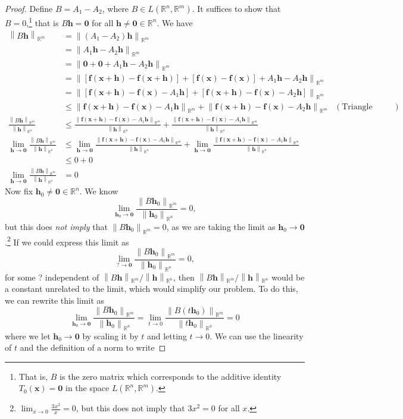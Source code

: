 \documentclass{article}
\newcommand{\R}{\mathbb{R}}
\newcommand{\x}{\mathbf{x}}
\newcommand{\f}{\mathbf{f}}
\newcommand{\h}{\mathbf{h}}
\newcommand{\ze}{\mathbf{0}}
\newcommand{\norm}[1]{\left\lVert#1\right\rVert}
\theoremstyle{definition}
\begin{document}
	\begin{proof}
		Define $ B = A_1 - A_2 $, where $ B\in L(\R^n,\R^m) $. It suffices to show that $ B = 0 $,\footnote{That is, $ B $ is the zero matrix which corresponds to the additive identity $ T_0(\x)=\ze $ in the space $ L(\R^n,\R^m) $. } that is $ B\h = \ze $ for all $ \h\neq\ze\in \R^n $. We have 
		\begin{align*}
			\norm{B\h}_{\R^m} &= \norm{(A_1 - A_2)\h}_{\R^m}\\
			& = \norm{ A_1\h -  A_2\h}_{\R^m}\\ 
			& = \norm{ \ze + \ze + A_1\h -  A_2\h}_{\R^m} \\
			& = \norm{ \left[\f(\x+\h) - \f(\x+\h)\right] +\left[\f(\x) - \f(\x)\right] + A_1\h -  A_2\h}_{\R^m} \\
			& = \norm{ \left[\f(\x+\h) - \f(\x) - A_1\h \right] +\left[\f(\x+\h) - \f(\x) - A_2\h \right]}_{\R^m}\\
			& \le \norm{\f(\x+\h) - \f(\x) - A_1\h}_{\R^m} +  \norm{\f(\x+\h) - \f(\x) - A_2\h}_{\R^m} & (\text{Triangle Inequality})
			\\\frac{\norm{B\h}_{\R^m}}{\norm{\h}_{\R^n}} & \le \frac{\norm{\f(\x+\h) - \f(\x) - A_1\h}_{\R^m} }{\norm{\h}_{\R^n}} + \frac{\norm{\f(\x+\h) - \f(\x) - A_1\h}_{\R^m} }{\norm{\h}_{\R^n}}	\\ 	\lim\limits_{\mathbf h\to \ze}\frac{\norm{B\h}_{\R^m}}{\norm{\h}_{\R^n}} & \le 	\lim\limits_{\mathbf h\to \ze}\frac{\norm{\f(\x+\h) - \f(\x) - A_1\h}_{\R^m} }{\norm{\h}_{\R^n}} + 	\lim\limits_{\mathbf h\to \ze}\frac{\norm{\f(\x+\h) - \f(\x) - A_1\h}_{\R^m} }{\norm{\h}_{\R^n}}\\ & \le 0 + 0 \\\lim\limits_{\mathbf h\to \ze}\frac{\norm{B\h}_{\R^m}}{\norm{\h}_{\R^n}}& = 0
		\end{align*}
		Now fix $ \h_0\neq \ze \in \R^n $. We know $$ \lim\limits_{\mathbf h_0\to \ze}\frac{\norm{B\h_0}_{\R^m}}{\norm{\h_0}_{\R^n}}= 0,$$ but this does \textit{not imply} that $ \norm{B\h_0}_{\R^m} = 0 $, as we are taking the limit as $\mathbf h_0\to\ze$.\footnote{$ \lim_{x\to0}\frac{3x^2}{x}=0 $, but this does not imply that $ 3x^2 = 0 $ for all $ x $. } If we could express this limit as 
		$$ \lim\limits_{?\to \ze}\frac{\norm{B\h_0}_{\R^m}}{\norm{\h_0}_{\R^n}}= 0,$$ for some ? independent of ${\norm{ B\h}_{\R^m}}/{\norm{\h}_{\R^n}}$, then ${\norm{ B\h}_{\R^m}}/{\norm{\h}_{\R^n}}$ would be a constant unrelated to the limit, which would simplify our problem. To do this, we can rewrite this limit as 
		$$\lim\limits_{\mathbf h_0\to \ze}\frac{\norm{B\h_0}_{\R^m}}{\norm{\h_0}_{\R^n}}= \lim\limits_{t\to 0}\frac{\norm{B(t\h_0)}_{\R^m}}{\norm{t\h_0}_{\R^n}} = 0$$ where we let $ \h_0\to\ze $ by scaling it by $ t $ and letting $ t\to 0 $. We can use the linearity of $ t $ and the definition of a norm to write 

\end{proof}
\end{document}
